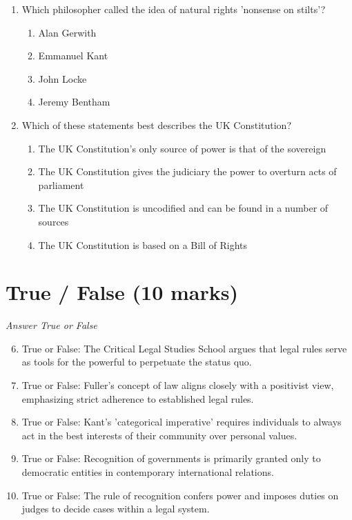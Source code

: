 \documentclass[12pt]{article}
\begin{document}
\begin{enumerate}[label=\arabic*.]
\begin{enumerate}[label=(\alph*)]
\end{enumerate}
\item Which philosopher called the idea of natural rights 'nonsense on stilts'?
\begin{enumerate}[label=(\alph*)]
    \item Alan Gerwith
    \item Emmanuel Kant
    \item John Locke
    \item Jeremy Bentham
\end{enumerate}
\item Which of these statements best describes the UK Constitution?
\begin{enumerate}[label=(\alph*)]
    \item The UK Constitution's only source of power is that of the sovereign
    \item The UK Constitution gives the judiciary the power to overturn acts of parliament
    \item The UK Constitution is uncodified and can be found in a number of sources
    \item The UK Constitution is based on a Bill of Rights
\end{enumerate}
\end{enumerate}

\section*{True / False (10 marks)}
\textit{Answer True or False}
\begin{enumerate}[label=\arabic*.]
\setcounter{enumi}{5}
\item True or False: The Critical Legal Studies School argues that legal rules serve as tools for the powerful to perpetuate the status quo.
\item True or False: Fuller's concept of law aligns closely with a positivist view, emphasizing strict adherence to established legal rules.
\item True or False: Kant's 'categorical imperative' requires individuals to always act in the best interests of their community over personal values.
\item True or False: Recognition of governments is primarily granted only to democratic entities in contemporary international relations.
\item True or False: The rule of recognition confers power and imposes duties on judges to decide cases within a legal system.
\end{enumerate}
\end{document}
